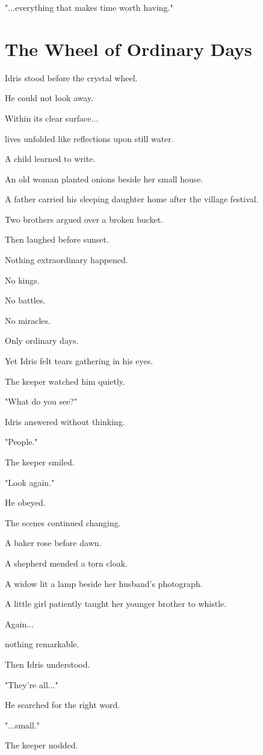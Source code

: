 \documentclass[12pt,openany]{book}
\begin{document}
"...everything that makes time worth having."
\section*{The Wheel of Ordinary Days}

Idris stood before the crystal wheel.

He could not look away.

Within its clear surface...

lives unfolded like reflections upon still water.

A child learned to write.

An old woman planted onions beside her small house.

A father carried his sleeping daughter home after the village festival.

Two brothers argued over a broken bucket.

Then laughed before sunset.

Nothing extraordinary happened.

No kings.

No battles.

No miracles.

Only ordinary days.

Yet Idris felt tears gathering in his eyes.

The keeper watched him quietly.

"What do you see?"

Idris answered without thinking.

"People."

The keeper smiled.

"Look again."

He obeyed.

The scenes continued changing.

A baker rose before dawn.

A shepherd mended a torn cloak.

A widow lit a lamp beside her husband's photograph.

A little girl patiently taught her younger brother to whistle.

Again...

nothing remarkable.

Then Idris understood.

"They're all..."

He searched for the right word.

"...small."

The keeper nodded.
\end{document}
